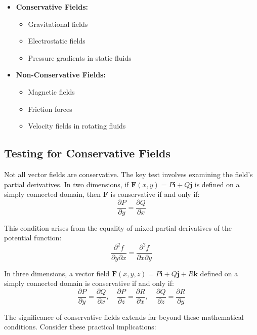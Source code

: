 \begin{itemize}
   \item \textbf{Conservative Fields:}
       \begin{itemize}
           \item Gravitational fields
           \item Electrostatic fields
           \item Pressure gradients in static fluids
       \end{itemize}
       
   \item \textbf{Non-Conservative Fields:} 
       \begin{itemize}
           \item Magnetic fields
           \item Friction forces
           \item Velocity fields in rotating fluids
       \end{itemize}
\end{itemize}

\subsection*{Testing for Conservative Fields}

\noindent Not all vector fields are conservative. The key test involves examining the field's partial derivatives. In two dimensions, if $\mathbf{F}(x,y) = P\mathbf{i} + Q\mathbf{j}$ is defined on a simply connected domain, then $\mathbf{F}$ is conservative if and only if:
\[
\frac{\partial P}{\partial y} = \frac{\partial Q}{\partial x}
\]

\noindent This condition arises from the equality of mixed partial derivatives of the potential function:
\[
\frac{\partial^2 f}{\partial y\partial x} = \frac{\partial^2 f}{\partial x\partial y}
\]

\noindent In three dimensions, a vector field $\mathbf{F}(x,y,z) = P\mathbf{i} + Q\mathbf{j} + R\mathbf{k}$ defined on a simply connected domain is conservative if and only if:
\[
\frac{\partial P}{\partial y} = \frac{\partial Q}{\partial x}, \quad
\frac{\partial P}{\partial z} = \frac{\partial R}{\partial x}, \quad
\frac{\partial Q}{\partial z} = \frac{\partial R}{\partial y}
\]

\noindent The significance of conservative fields extends far beyond these mathematical conditions. Consider these practical implications:

